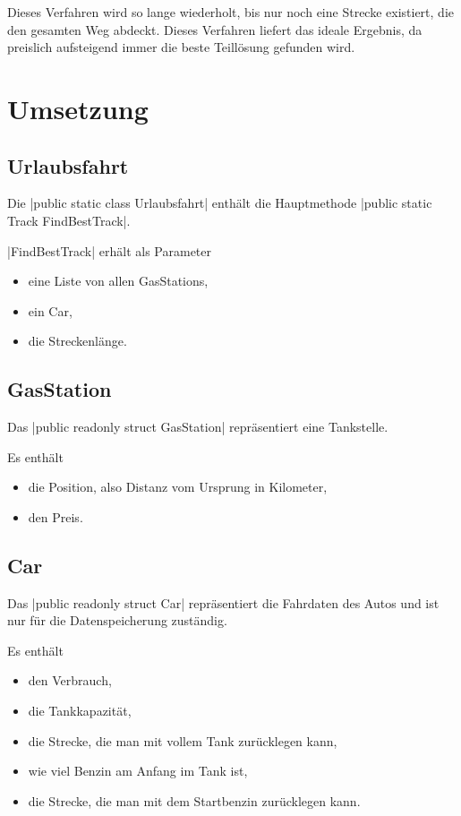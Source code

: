 \documentclass[a4paper,10pt,ngerman]{scrartcl}
\begin{document}
Dieses Verfahren wird so lange wiederholt, bis nur noch eine Strecke existiert, die den gesamten Weg abdeckt.
Dieses Verfahren liefert das ideale Ergebnis, da preislich aufsteigend immer die beste Teillösung gefunden wird.
 

\section{Umsetzung}

\subsection{Urlaubsfahrt}
    Die |public static class Urlaubsfahrt| enthält die Hauptmethode |public static Track FindBestTrack|.
    
    |FindBestTrack| erhält als Parameter
        \begin{itemize}
        \item eine Liste von allen GasStations,
        \item ein Car,
        \item die Streckenlänge.
    \end{itemize}
   
\subsection{GasStation}
    Das |public readonly struct GasStation| repräsentiert eine Tankstelle.

    Es enthält
    \begin{itemize}
    	\item die Position, also Distanz vom Ursprung in Kilometer,
    	\item den Preis.
    \end{itemize}
    
\subsection{Car}
    Das |public readonly struct Car| repräsentiert die Fahrdaten des Autos und ist nur für die Datenspeicherung zuständig.

    Es enthält
    \begin{itemize}
        \item den Verbrauch,
        \item die Tankkapazität,
        \item die Strecke, die man mit vollem Tank zurücklegen kann,
        \item wie viel Benzin am Anfang im Tank ist,
        \item die Strecke, die man mit dem Startbenzin zurücklegen kann.
    \end{itemize}
    
\end{document}
